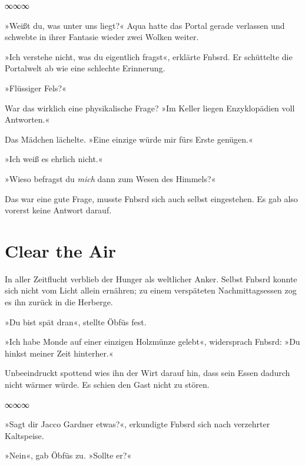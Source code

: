 


\begin{center}
∞∞∞
\end{center}

»Weißt du, was unter uns liegt?« Aqua hatte das Portal gerade verlassen und schwebte in ihrer Fantasie wieder zwei Wolken weiter.

»Ich verstehe nicht, was du eigentlich fragst«, erklärte Fnbsrd. Er schüttelte die Portalwelt ab wie eine schlechte Erinnerung.

»Flüssiger Fels?«

War das wirklich eine physikalische Frage? »Im Keller liegen Enzyklopädien voll Antworten.«

Das Mädchen lächelte. »Eine einzige würde mir fürs Erste genügen.«

»Ich weiß es ehrlich nicht.«

»Wieso befragst du \emph{mich} dann zum Wesen des Himmels?«

Das war eine gute Frage, musste Fnbsrd sich auch selbst eingestehen. Es gab also vorerst keine Antwort darauf.


\chapter{Clear the Air}

In aller Zeitflucht verblieb der Hunger als weltlicher Anker. Selbst Fnbsrd konnte sich nicht vom Licht allein ernähren; zu einem verspäteten Nachmittagsessen zog es ihn zurück in die Herberge.

»Du bist spät dran«, stellte Öbfüs fest.

»Ich habe Monde auf einer einzigen Holzmünze gelebt«, widersprach Fnbsrd: »Du hinkst meiner Zeit hinterher.«

Unbeeindruckt spottend wies ihn der Wirt darauf hin, dass sein Essen dadurch nicht wärmer würde. Es schien den Gast nicht zu stören.

\begin{center}
∞∞∞
\end{center}

»Sagt dir Jacco Gardner etwas?«, erkundigte Fnbsrd sich nach verzehrter Kaltspeise.

»Nein«, gab Öbfüs zu. »Sollte er?«

